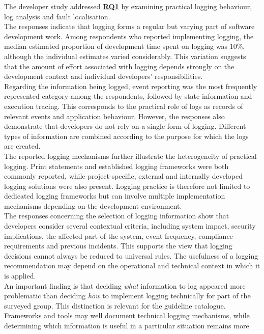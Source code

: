 The developer study addressed \hyperref[table:t1rq]{\textbf{RQ1}} by examining practical logging behaviour,
log analysis and fault localisation.
\\
The responses indicate that logging forms a regular but varying part of software development work.
Among respondents who reported implementing logging, the median estimated proportion of development 
time spent on logging was 10\%, although the individual estimates varied considerably. 
This variation suggests that the amount of effort associated with logging depends strongly 
on the development context and individual developers' responsibilities.
\\
Regarding the information being logged, event reporting was the most 
frequently represented category among the respondents, followed by state 
information and execution tracing. This corresponds to the practical role 
of logs as records of relevant events and application behaviour. 
However, the responses also demonstrate that developers do not rely on a single form of logging. 
Different types of information are combined according to the purpose for which the logs are created.
\\
The reported logging mechanisms further illustrate the heterogeneity of practical logging. 
Print statements and established logging frameworks were both commonly reported, while project-specific, 
external and internally developed logging solutions were also present. Logging practice is therefore 
not limited to dedicated logging frameworks but can involve multiple implementation mechanisms 
depending on the development environment.
\\
The responses concerning the selection of logging information show that developers 
consider several contextual criteria, including system impact, security implications, 
the affected part of the system, event frequency, compliance requirements and previous incidents. 
This supports the view that logging decisions cannot always be reduced to universal rules. 
The usefulness of a logging recommendation may depend on the operational and technical context in which it is applied.
\\
An important finding is that deciding \textit{what} information to log appeared 
more problematic than deciding \textit{how} to implement logging technically 
for part of the surveyed group. This distinction is relevant for the guideline catalogue. 
Frameworks and tools may well document technical logging mechanisms, 
while determining which information is useful in a particular situation remains more 
